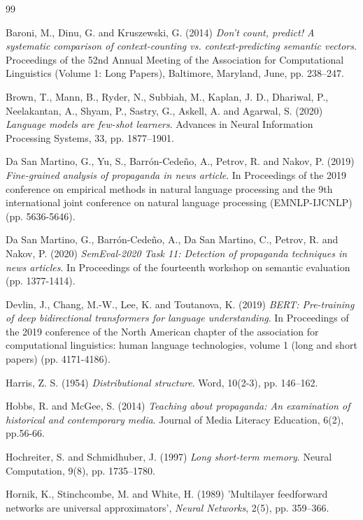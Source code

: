 \documentclass[12pt, a4paper]{article}
\begin{document}
\newpage
\begin{thebibliography}{99}

 Baroni, M., Dinu, G. and Kruszewski, G. (2014) \textit{Don't count, predict! A systematic comparison of context-counting vs. context-predicting semantic vectors}. Proceedings of the 52nd Annual Meeting of the Association for Computational Linguistics (Volume 1: Long Papers), Baltimore, Maryland, June, pp. 238–247.

 Brown, T., Mann, B., Ryder, N., Subbiah, M., Kaplan, J. D., Dhariwal, P., Neelakantan, A., Shyam, P., Sastry, G., Askell, A. and Agarwal, S. (2020) \textit{Language models are few-shot learners}. Advances in Neural Information Processing Systems, 33, pp. 1877–1901.

 Da San Martino, G., Yu, S., Barrón-Cedeño, A., Petrov, R. and Nakov, P. (2019) \textit{Fine-grained analysis of propaganda in news article}. In Proceedings of the 2019 conference on empirical methods in natural language processing and the 9th international joint conference on natural language processing (EMNLP-IJCNLP) (pp. 5636-5646).

 Da San Martino, G., Barrón-Cedeño, A., Da San Martino, C., Petrov, R. and Nakov, P. (2020) \textit{SemEval-2020 Task 11: Detection of propaganda techniques in news articles}. In Proceedings of the fourteenth workshop on semantic evaluation (pp. 1377-1414).

 Devlin, J., Chang, M.-W., Lee, K. and Toutanova, K. (2019) \textit{BERT: Pre-training of deep bidirectional transformers for language understanding}. In Proceedings of the 2019 conference of the North American chapter of the association for computational linguistics: human language technologies, volume 1 (long and short papers) (pp. 4171-4186).

 Harris, Z. S. (1954) \textit{Distributional structure}.  Word, 10(2-3), pp. 146–162.

 Hobbs, R. and McGee, S. (2014) \textit{Teaching about propaganda: An examination of historical and contemporary media}. Journal of Media Literacy Education, 6(2), pp.56-66.

 Hochreiter, S. and Schmidhuber, J. (1997) \textit{Long short-term memory}. Neural Computation, 9(8), pp. 1735–1780.

 Hornik, K., Stinchcombe, M. and White, H. (1989) 'Multilayer feedforward networks are universal approximators', \textit{Neural Networks}, 2(5), pp. 359–366.


\end{thebibliography}
\end{document}
